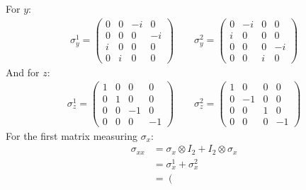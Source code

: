 \documentclass[12pt,a4]{article}
\begin{document}
\begin{enumerate}
    For $y$:
    \begin{align*}
      \sigma_{y}^{1} = 
                       \left(\begin{matrix}
                        0 &  0 &-i &  0\\
                        0 &  0 & 0 & -i\\
                         i&  0 & 0 &  0\\
                        0 &  i & 0 &  0
                      \end{matrix} \right)
                      \qquad
      \sigma_{y}^{2} =  
                      \left(\begin{matrix}
                        0 &  -i & 0 &  0\\
                        i&  0 & 0 &  0\\
                        0 &  0 & 0 &-i\\
                        0 &  0 &i &  0
                      \end{matrix} \right)
    \end{align*}
    And for $z$:
    \begin{align*}
      \sigma_{z}^{1} =                       
                       \left(\begin{matrix}
                        1 &  0 & 0 &  0\\
                        0 &  1 & 0 &  0\\
                        0 &  0 &-1 &  0\\
                        0 &  0 & 0 & -1
                      \end{matrix} \right)
                      \qquad
      \sigma_{z}^{2} =  
                       \left(\begin{matrix}
                        1 &  0 & 0 &  0\\
                        0 & -1 & 0 &  0\\
                        0 &  0 & 1 &  0\\
                        0 &  0 & 0 & -1
                      \end{matrix} \right)
    \end{align*}
    For the first matrix measuring $\sigma_x$:
    \begin{align*}
      \sigma_{xx} &= \sigma_x \otimes I_2 +  I_2 \otimes \sigma_x\\
                  &= \sigma_x^1 + \sigma_x^2\\
                  &=
                      \left( \begin{matrix}

\end{matrix}
\end{align*}
\end{enumerate}
\end{document}
